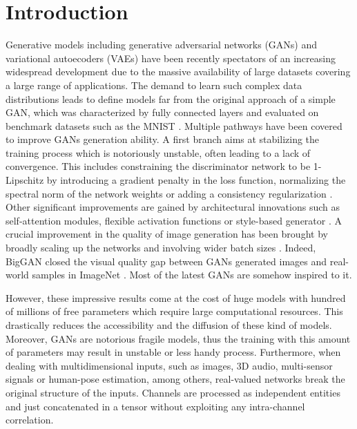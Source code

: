 \documentclass[graybox]{svmult}
\begin{document}
\section{Introduction}
\label{sec:intro}
\noindent Generative models including generative adversarial networks (GANs) \cite{GoodfellowNIPS2014} and variational autoecoders (VAEs) \cite{KingmaARXIV2014} have been recently spectators of an increasing widespread development due to the massive availability of large datasets covering a large range of applications. The demand to learn such complex data distributions leads to define models far from the original approach of a simple GAN, which was characterized by fully connected layers and evaluated on benchmark datasets such as the MNIST \cite{GoodfellowNIPS2014}. Multiple pathways have been covered to improve GANs generation ability. A first branch aims at stabilizing the training process which is notoriously unstable, often leading to a lack of convergence. This includes constraining the discriminator network to be 1-Lipschitz by introducing a gradient penalty in the loss function, normalizing the spectral norm of the network weights or adding a consistency regularization \cite{Arjovsky2017WassersteinG, GulrajaniNIPS2017, Miyato2018SpectralNF, ZhangConsRegGAN2020}. 
Other significant improvements are gained by architectural innovations such as self-attention modules, flexible activation functions or style-based generator \cite{KarrasStyleGen2019, GrassucciFlexGAN2021, ZhangSAGAN2019, KarrasPG2018}. A crucial improvement in the quality of image generation has been brought by broadly scaling up the networks and involving wider batch sizes \cite{Brock2019LargeSG, KarrasSG22020, schonfeld2021unet}. Indeed, BigGAN closed the visual quality gap between GANs generated images and real-world samples in ImageNet \cite{Brock2019LargeSG}. Most of the latest GANs are somehow inspired to it. 

However, these impressive results come at the cost of huge models with hundred of millions of free parameters which require large computational resources. This drastically reduces the accessibility and the diffusion of these kind of models. Moreover, GANs are notorious fragile models, thus the training with this amount of parameters may result in unstable or less handy process.
Furthermore, when dealing with multidimensional inputs, such as images, 3D audio, multi-sensor signals or human-pose estimation, among others, real-valued networks break the original structure of the inputs. Channels are processed as independent entities and just concatenated in a tensor without exploiting any intra-channel correlation.
\end{document}
